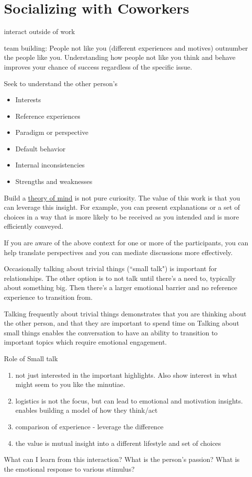 \section{Socializing with Coworkers\label{sec:socializing}}

interact outside of work

team building:
People not like you (different experiences and motives) outnumber the people like you.
Understanding how people not like you think and behave improves your chance of success regardless of the specific issue.

Seek to understand the other person's
\begin{itemize}
\item Interests
\item Reference experiences
\item Paradigm or perspective
\item Default behavior
\item Internal inconsistencies
\item Strengths and weaknesses
\end{itemize}

Build a \href{https://en.wikipedia.org/wiki/Theory_of_mind}{theory of mind} is not pure curiosity. The value of this work is that you can leverage this insight. For example, you can present explanations or a set of choices in a way that is more likely to be received as you intended and is more efficiently conveyed.  

If you are aware of the above context for one or more of the participants, you can help translate perspectives and you can mediate discussions more effectively. 

Occasionally talking about trivial things (``small talk") is important for relationships.
The other option is to not talk until there's a need to, typically about something big. Then there's a larger emotional barrier and no reference experience to transition from.

Talking frequently about trivial things demonstrates that you are thinking about the other person, and that they are important to spend time on
Talking about small things enables the conversation to have an ability to transition to important topics which require emotional engagement.

Role of Small talk
\begin{enumerate}
\item not just interested in the important highlights. Also show interest in what might seem to you like the minutiae. 
\item logistics is not the focus, but can lead to emotional and motivation insights. enables building a model of how they think/act
\item comparison of experience - leverage the difference
\item the value is mutual insight into a different lifestyle and set of choices
\end{enumerate}

What can I learn from this interaction?
What is the person's passion?
What is the emotional response to various stimulus?


